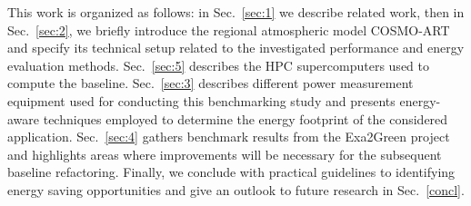 This  work is organized  as follows:  in Sec.~\ref{sec:1}  we describe
related  work,  then in  Sec.~\ref{sec:2},  we  briefly introduce  the
regional atmospheric  model COSMO-ART and specify  its technical setup
related to the investigated performance and energy evaluation methods.
Sec.~\ref{sec:5} describes the HPC  supercomputers used to compute the
baseline.  Sec.~\ref{sec:3}   describes  different  power  measurement
equipment  used for  conducting this  benchmarking study  and presents
energy-aware techniques employed to  determine the energy footprint of
the   considered  application.   Sec.~\ref{sec:4}   gathers  benchmark
results  from  the  Exa2Green   project  and  highlights  areas  where
improvements   will   be  necessary   for   the  subsequent   baseline
refactoring.   Finally,  we  conclude  with  practical  guidelines  to
identifying energy saving opportunities  and give an outlook to future
research in Sec.~\ref{concl}.
